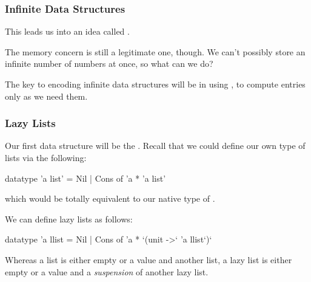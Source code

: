 \documentclass[aspectratio=169, handout]{beamer}
\begin{document}
\begin{frame}[fragile]
  \frametitle{Infinite Data Structures}

  This leads us into an idea called .

  \vspace{\fill}


  \pause
  \vspace{\fill}

  The memory concern is still a legitimate one, though. We can't possibly store
  an infinite number of numbers at once, so what can we do?

  \pause
  \vspace{\fill}

  The key to encoding infinite data structures will be in using ,
  to compute entries only as we need them.
\end{frame}

\begin{frame}[fragile]
  \frametitle{Lazy Lists}

  \rprs

  Our first data structure will be the . Recall that
  we could define our own type of lists via the following:
  \begin{codeblock}
    datatype 'a list' = Nil | Cons of 'a * 'a list'
  \end{codeblock}
  which would be totally equivalent to our native type of .

  \pause
  \vspace{\fill}

  We can define lazy lists as follows:
  \begin{codeblock}
    datatype 'a llist = Nil | Cons of 'a * `(unit ->` 'a llist`)`
  \end{codeblock}

  \pause
  \vspace{\fill}

  Whereas a list is either empty or a value and another list, a lazy list
  is either empty or a value and a \textit{suspension} of another lazy list.
\end{frame}
\end{document}
